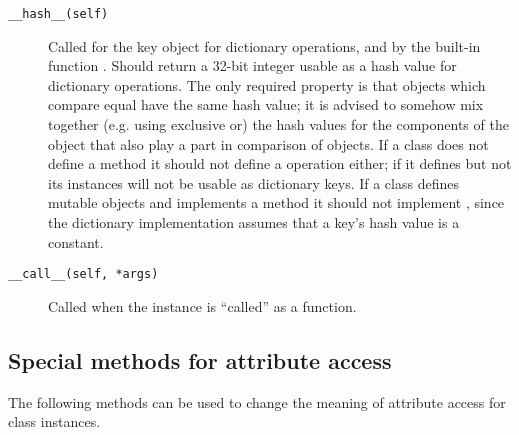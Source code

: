 \begin{description}
\item[{\tt __hash__(self)}]
Called for the key object for dictionary operations,
and by the built-in function
.  Should return a 32-bit integer usable as a hash value
for dictionary operations.  The only required property is that objects
which compare equal have the same hash value; it is advised to somehow
mix together (e.g. using exclusive or) the hash values for the
components of the object that also play a part in comparison of
objects.  If a class does not define a  method it should
not define a  operation either; if it defines
 but not  its instances will not be
usable as dictionary keys.  If a class defines mutable objects and
implements a  method it should not implement
, since the dictionary implementation assumes that a
key's hash value is a constant.

\item[{\tt __call__(self, *args)}]
Called when the instance is ``called'' as a function.

\end{description}


\subsection{Special methods for attribute access}

The following methods can be used to change the meaning of attribute
access for class instances.

